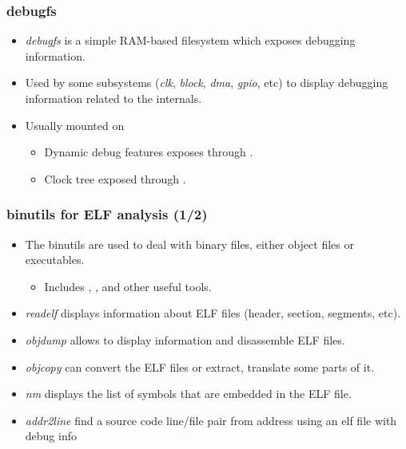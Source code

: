 \begin{frame}
  \frametitle{debugfs}
  \begin{itemize}
    \item {\em debugfs} is a simple RAM-based filesystem which exposes debugging
          information.
    \item Used by some subsystems ({\em clk}, {\em block}, {\em dma}, {\em gpio},
          etc) to
          display debugging information related to the internals.
    \item Usually mounted on 
    \begin{itemize}
      \item Dynamic debug features exposes through .
      \item Clock tree exposed through .
    \end{itemize}
  \end{itemize}
\end{frame}

\begin{frame}[fragile]
  \frametitle{binutils for ELF analysis (1/2)}
  \begin{itemize}
    \item The binutils are used to deal with binary files, either object files
          or executables.
    \begin{itemize}
      \item Includes , , and other useful tools.
    \end{itemize}
    \item {\em readelf} displays information about ELF files (header, section,
          segments, etc).
    \item {\em objdump} allows to display information and disassemble ELF
          files.
    \item {\em objcopy} can convert the ELF files or extract, translate some
          parts of it.
    \item {\em nm} displays the list of symbols that are embedded in the ELF
          file.
    \item {\em addr2line} find a source code line/file pair from address using
          an elf file with debug info
  \end{itemize}
\end{frame}

